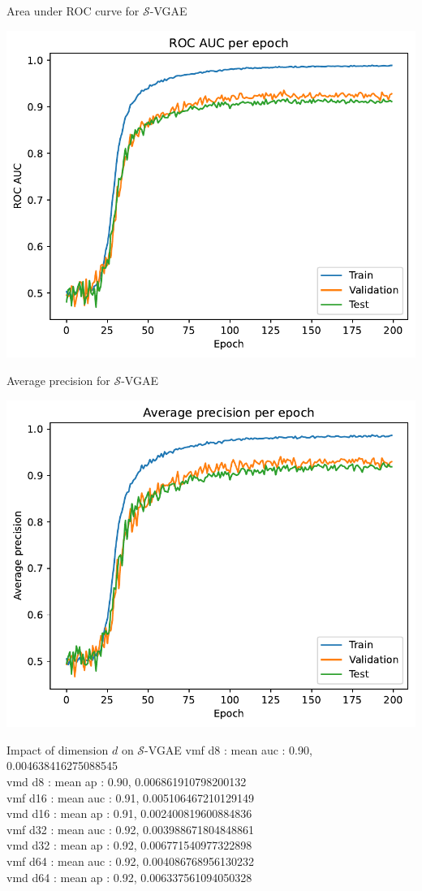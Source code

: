 \begin{frame}{Area under ROC curve for $\mathcal{S}$-VGAE}
  \begin{center}
    \includegraphics[width=.8\hsize]{figures/vMF_auc.pdf}
  \end{center}
\end{frame}

\begin{frame}{Average precision for $\mathcal{S}$-VGAE}
  \begin{center}
    \includegraphics[width=.8\hsize]{figures/vMF_ap.pdf}
  \end{center}
\end{frame}

\begin{frame}{Impact of dimension $d$ on $\mathcal{S}$-VGAE}
  \centering
  vmf d8 : mean auc : 0.90, 0.004638416275088545 \\
  vmd d8 : mean ap : 0.90, 0.006861910798200132 \\
  vmf d16 : mean auc : 0.91, 0.005106467210129149 \\
  vmd d16 : mean ap : 0.91, 0.002400819600884836 \\
  vmf d32 : mean auc : 0.92, 0.003988671804848861 \\
  vmd d32 : mean ap : 0.92, 0.006771540977322898 \\
  vmf d64 : mean auc : 0.92, 0.004086768956130232 \\
  vmd d64 : mean ap : 0.92, 0.006337561094050328 \\
\end{frame}